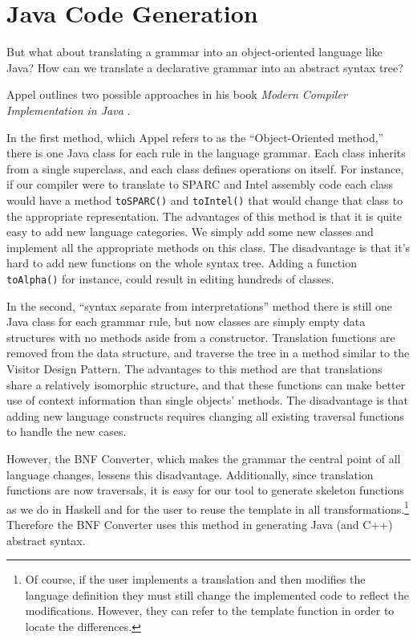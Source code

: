 \documentclass{llncs}
\begin{document}




\section{Java Code Generation}

But what about translating a grammar into an object-oriented language like Java? How can we translate a declarative grammar into an abstract syntax tree?

Appel outlines two possible approaches in his book \textit{Modern Compiler Implementation in Java} \cite{AppelJ}. 

In the first method, which Appel refers to as the ``Object-Oriented method,''
there is one Java class for each rule in the language grammar. Each class
inherits from a single superclass, and each class defines operations on itself.
For instance, if our compiler were to translate to SPARC and Intel assembly code
each class would have a method \texttt{toSPARC()} and \texttt{toIntel()} that would change that
class to the appropriate representation. The advantages of this method is that
it is quite easy to add new language categories. We simply add
some new classes and implement all the appropriate methods on this class. The
disadvantage is that it's hard to add new functions on the whole syntax tree.
Adding a function \texttt{toAlpha()} for instance, could result in editing hundreds of classes.

In the second, ``syntax separate from interpretations'' method there is still one Java class for each grammar rule, but now classes are simply empty data structures with no methods aside from a constructor. Translation functions are removed from the data structure, and traverse the tree in a method similar to the Visitor Design Pattern. The advantages to this method are that translations share a relatively isomorphic structure, and that these functions can make better use of context information than single objects' methods. The disadvantage is that adding new language constructs requires changing all existing traversal functions to handle the new cases.

However, the BNF Converter, which makes the grammar the central point of all language changes, lessens this disadvantage.  Additionally, since translation functions are now traversals, it is easy for our tool to generate skeleton functions as we do in Haskell and for the user to reuse the template in all transformations.\footnote{Of course, if the user implements a translation and then modifies the language definition they must still change the implemented code to reflect the modifications. However, they can refer to the template function in order to locate the differences.} Therefore the BNF Converter uses this method in generating Java (and C++) abstract syntax.
\end{document}
